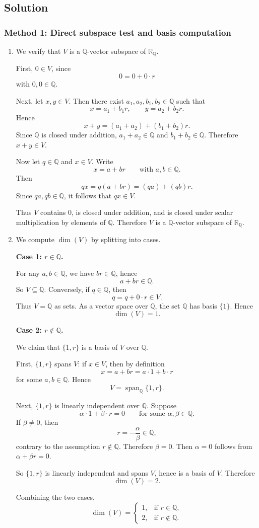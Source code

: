 \documentclass[12pt]{article}
\newcommand{\Q}{\mathbb{Q}}
\newcommand{\R}{\mathbb{R}}
\newcommand{\dimn}{\operatorname{dim}}
\begin{document}
\subsection{Solution}

\subsubsection{Method 1: Direct subspace test and basis computation}
\begin{enumerate}[label=(\alph*)]
\item We verify that \(V\) is a \(\Q\)-vector subspace of \(\R_{\Q}\).

First, \(0\in V\), since
\[
0=0+0\cdot r
\]
with \(0,0\in\Q\).

Next, let \(x,y\in V\). Then there exist \(a_1,a_2,b_1,b_2\in\Q\) such that
\[
x=a_1+b_1r,
\qquad
y=a_2+b_2r.
\]
Hence
\[
x+y=(a_1+a_2)+(b_1+b_2)r.
\]
Since \(\Q\) is closed under addition, \(a_1+a_2\in\Q\) and \(b_1+b_2\in\Q\). Therefore \(x+y\in V\).

Now let \(q\in\Q\) and \(x\in V\). Write
\[
x=a+br
\qquad\text{with } a,b\in\Q.
\]
Then
\[
q x = q(a+br)=(qa)+(qb)r.
\]
Since \(qa,qb\in\Q\), it follows that \(qx\in V\).

Thus \(V\) contains \(0\), is closed under addition, and is closed under scalar multiplication by elements of \(\Q\). Therefore \(V\) is a \(\Q\)-vector subspace of \(\R_{\Q}\).

\item We compute \(\dimn(V)\) by splitting into cases.

\textbf{Case 1: \(r\in\Q\).}

For any \(a,b\in\Q\), we have \(br\in\Q\), hence
\[
a+br\in\Q.
\]
So \(V\subseteq \Q\). Conversely, if \(q\in\Q\), then
\[
q=q+0\cdot r\in V.
\]
Thus \(V=\Q\) as sets. As a vector space over \(\Q\), the set \(\Q\) has basis \(\{1\}\). Hence
\[
\dimn(V)=1.
\]

\textbf{Case 2: \(r\notin\Q\).}

We claim that \(\{1,r\}\) is a basis of \(V\) over \(\Q\).

First, \(\{1,r\}\) spans \(V\): if \(x\in V\), then by definition
\[
x=a+br=a\cdot 1+b\cdot r
\]
for some \(a,b\in\Q\). Hence
\[
V=\operatorname{span}_{\Q}\{1,r\}.
\]

Next, \(\{1,r\}\) is linearly independent over \(\Q\). Suppose
\[
\alpha\cdot 1+\beta\cdot r=0
\qquad\text{for some } \alpha,\beta\in\Q.
\]
If \(\beta\neq 0\), then
\[
r=-\frac{\alpha}{\beta}\in\Q,
\]
contrary to the assumption \(r\notin\Q\). Therefore \(\beta=0\). Then \(\alpha=0\) follows from \(\alpha+\beta r=0\).

So \(\{1,r\}\) is linearly independent and spans \(V\), hence is a basis of \(V\). Therefore
\[
\dimn(V)=2.
\]

Combining the two cases,
\[
\boxed{
\dimn(V)=
\begin{cases}
1, & \text{if } r\in\Q,\\[1mm]
2, & \text{if } r\notin\Q.
\end{cases}}
\]
\end{enumerate}
\end{document}
